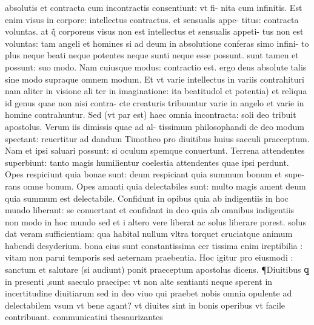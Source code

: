 \documentclass{article}
\begin{document}
\begin{pages}
absolutis et contracta cum incontractis consentiunt: vt fi- nita cum infinitis. Est enim visus in corpore: intellectus contractus. et sensualis appe- titus: contracta voluntas. at q̃ corporeus visus non est intellectus et sensualis appeti- tus non est voluntas: tam angeli et homines si ad deum in absolutione conferas simo infini- to plus neque beati neque potentes neque sunti neque esse possunt. sunt tamen et possunt: suo modo. Nam cuiusque modus: contractio est. ergo deus absolute talis sine modo supraque  omnem modum. Et vt varie intellectus in variis contrahituri nam aliter in visione ali ter in imaginatione: ita beatitudol et potentia) et reliqua id genus quae non nisi contra- cte creaturis tribuuntur varie in angelo et varie in homine contrahuntur. Sed (vt par est) haec omnia incontracta: soli deo tribuit apostolus. Verum iis dimissis quae ad al- tissimum philosophandi de deo modum spectant: reuertitur ad dandum Timotheo pro diuitibus huius saeculi praeceptum. Nam et ipsi saluari possunt: si oculum spemque conuertunt. Terrena attendentes superbiunt: tanto magis humilientur coelestia attendentes quae ipsi perdunt. Opes respiciunt quia bonae sunt: deum respiciant quia summum bonum et supe- rans omne bonum. Opes amanti quia delectabiles sunt: multo magis ament deum quia summum est delectabile. Confidunt in opibus quia ab indigentiis in hoc mundo liberant: se conuertant et confidant in deo quia ab omnibus indigentiis non modo in hoc mundo  sed et i altero vere liberat ac solus liberare porest. solus dat veram sufficientiam: qua habital nullum vltra torquet cruciatque animum habendi desyderium. bona eius sunt constantissima cer tissima enim ireptibilia : vitam non parui temporis sed aeternam praebentia. Hoc igitur pro eiusmodi : sanctum et salutare (si audiunt) ponit praeceptum apostolus dicens. ¶Diuitibus ꝗ in presenti ,sunt saeculo praecipe: vt non alte sentianti neque sperent in incertitudine diuitiarum sed in  deo viuo qui praebet nobis omnia opulente ad delectabilem vsum vt bene agant?  vt diuites sint in bonis operibus vt facile contribuant. communicatiui thesaurizantes  \pend

\end{pages}
\end{document}
